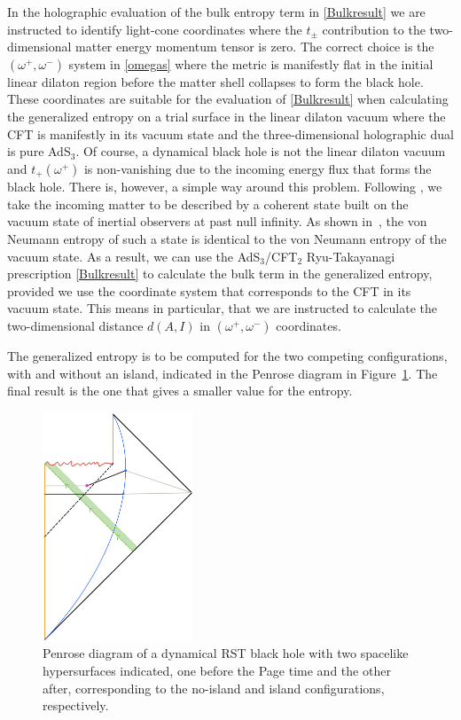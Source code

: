 \documentclass[12pt,a4paper]{article}
\begin{document}
In the holographic evaluation of the bulk entropy term in \eqref{Bulkresult} we are instructed to identify light-cone coordinates where the $t_\pm$ contribution to the two-dimensional matter energy momentum tensor is zero. The correct choice is the $(\omega^+,\omega^-)$ system in \eqref{omegas} where the metric is manifestly flat in the initial linear dilaton region before the matter shell collapses to form the black hole. These coordinates are suitable for the evaluation of \eqref{Bulkresult} when calculating the generalized entropy on a trial surface in the linear dilaton vacuum where the CFT is manifestly in its vacuum state and the three-dimensional holographic dual is pure AdS$_3$. Of course, a dynamical black hole is not the linear dilaton vacuum and $t_+(\omega^+)$ is non-vanishing due to the incoming energy flux that forms the black hole. There is, however, a simple way around this problem. Following \cite{Fiola:1994ir}, we take the incoming matter to be described by a coherent state built on the vacuum state of inertial observers at past null infinity. As shown in~\cite{Fiola:1994ir}, the von Neumann entropy of such a state is identical to the von Neumann entropy of the vacuum state. As a result, we can use the AdS$_3$/CFT$_2$ Ryu-Takayanagi prescription \eqref{Bulkresult} to calculate the bulk term in the generalized entropy, provided we use the coordinate system that corresponds to the CFT in its vacuum state. This means in particular, that we are instructed to calculate the two-dimensional distance $d(A,I)$ in $(\omega^+,\omega^-)$ coordinates. 

The generalized entropy is to be computed for the two competing configurations, with and without an island, indicated in the Penrose diagram in Figure~\ref{island_rst}. The final result is the one that gives a smaller value for the entropy.

\begin{figure}[t]
\centering
\includegraphics[width=0.4\textwidth]{figures/1_penrose_island.jpeg}
\caption{\label{island_rst} Penrose diagram of a dynamical RST black hole with two spacelike hypersurfaces indicated, one before the Page time and the other after, corresponding to the no-island and island configurations, respectively.}
\end{figure}
\end{document}
